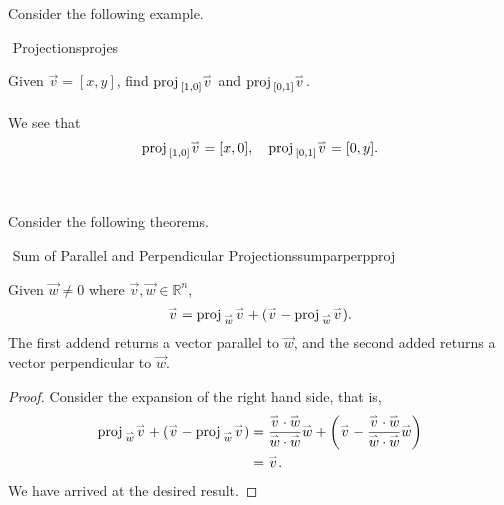         \vphantom
        \\
        \\
        Consider the following example.
        \begin{example}{\Difficulty \,\,Projections}{projes}
        
            Given \(\vec{v}=[x,y]\), find \(\text{proj\,}_{[1,0]}\overset{_{\rightharpoonup}}{v}\) and \(\text{proj\,}_{[0,1]}\overset{_{\rightharpoonup}}{v}\).
            \\
            \\
            We see that
            \begin{equation*}
                \text{proj\,}_{[1,0]}\overset{_{\rightharpoonup}}{v}=[x,0],\quad\text{proj\,}_{[0,1]}\overset{_{\rightharpoonup}}{v}=[0,y].
            \end{equation*}
        
        \end{example}
        \vphantom
        \\
        \\
        Consider the following theorems.
        \begin{theorem}{\Stop\,\,Sum of Parallel and Perpendicular Projections}{sumparperpproj}
        
            Given \(\vec{w}\neq0\) where \(\vec{v},\vec{w}\in\mathbb{R}^n\), 
            \begin{equation*}
                \overset{_{\rightharpoonup}}{v}=\text{proj\,}_{\overset{_{\rightharpoonup}}{w}}\overset{_{\rightharpoonup}}{v}+(\overset{_{\rightharpoonup}}{v}-\text{proj\,}_{\overset{_{\rightharpoonup}}{w}}\overset{_{\rightharpoonup}}{v}).
            \end{equation*}
            The first addend returns a vector parallel to \(\vec{w}\), and the second added returns a vector perpendicular to \(\vec{w}\).
            \begin{proof}
                Consider the expansion of the right hand side, that is,
                \begin{align*}
                    \text{proj\,}_{\overset{_{\rightharpoonup}}{w}}\overset{_{\rightharpoonup}}{v}+(\overset{_{\rightharpoonup}}{v}-\text{proj\,}_{\overset{_{\rightharpoonup}}{w}}\overset{_{\rightharpoonup}}{v})&=\frac{\overset{_{\rightharpoonup}}{v}\cdot\overset{_{\rightharpoonup}}{w}}{\overset{_{\rightharpoonup}}{w}\cdot\overset{_{\rightharpoonup}}{w}}\overset{_{\rightharpoonup}}{w}+\left(\overset{_{\rightharpoonup}}{v}-\frac{\overset{_{\rightharpoonup}}{v}\cdot\overset{_{\rightharpoonup}}{w}}{\overset{_{\rightharpoonup}}{w}\cdot\overset{_{\rightharpoonup}}{w}}\overset{_{\rightharpoonup}}{w}\right) \\
                    &=\overset{_{\rightharpoonup}}{v}.
                \end{align*}
                We have arrived at the desired result.
            \end{proof}
            
        
        \end{theorem}
